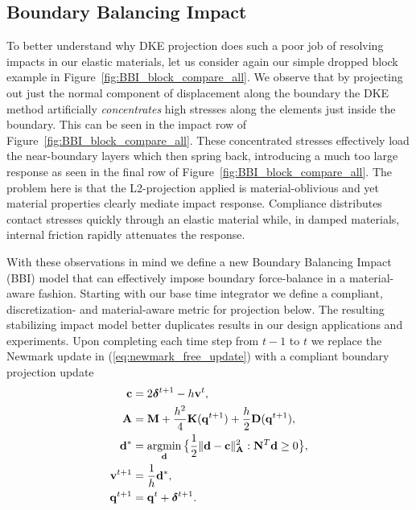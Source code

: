 \subsection{Boundary Balancing Impact}
To better understand why DKE projection does such a poor job of resolving impacts in our elastic materials, let us consider again our simple dropped block example in Figure~\ref{fig:BBI_block_compare_all}.
We observe that by projecting out just the normal component of displacement along the boundary the DKE method artificially \emph{concentrates} high stresses along the elements just inside the boundary. This can be seen in the impact row of Figure~\ref{fig:BBI_block_compare_all}.
These concentrated stresses effectively load the near-boundary layers which then spring back, introducing a much too large response as seen in the final row of Figure~\ref{fig:BBI_block_compare_all}.
The problem here is that the L2-projection applied is material-oblivious and yet material properties clearly mediate impact response. Compliance distributes contact stresses quickly through an elastic material while, in damped materials, internal friction rapidly attenuates the response. 

With these observations in mind we define a new Boundary Balancing Impact (BBI) model that can effectively impose boundary force-balance in a material-aware fashion. Starting with our base time integrator we define a compliant, discretization- and material-aware metric for projection below. The resulting stabilizing impact model better duplicates results in our design applications and experiments. Upon completing each time step from $t-1$ to $t$ we replace the Newmark update in (\ref{eq:newmark_free_update}) with a compliant boundary projection update
\begin{align}
\begin{split}
\mathbf {c} &= 2 \bm{\delta}^{t+1} - h \mathbf {v}^t, \\
\mathbf {A} &= \mathbf {M} + \frac{h^2}{4} \mathbf {K}(\mathbf {q}^{t+1}) + \frac{h}{2} \mathbf {D}(\mathbf {q}^{t+1}) ,\\
\mathbf {d}^* &= \mathop{\rm argmin}_{\mathbf {d}} \big\{ \frac{1}{2} \| \mathbf {d} - \mathbf {c} \|^2_{\mathbf {A}} : \mathbf {N}^T \mathbf {d} \geq 0 \big\},\\
\mathbf {v}^{t+1} &= \frac{1}{h} \mathbf {d}^*,\\
\mathbf {q}^{t+1} &= \mathbf {q}^t + \bm{\delta}^{t+1}.\\
\end{split}
\label{eq:newmark_predictor_proj}
\end{align}

